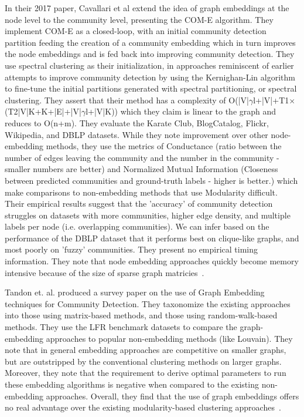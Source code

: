 \par{In their 2017 paper, Cavallari et al extend the idea of graph embeddings at the node level to the community level, presenting the COM-E algorithm. 
They implement COM-E as a closed-loop, with an initial community detection partition feeding the creation of a community embedding which in turn improves the node embeddings and is fed back into improving community detection. 
They use spectral clustering as their initialization, in approaches reminiscent of earlier attempts to improve community detection by using the Kernighan-Lin algorithm to fine-tune the initial partitions generated with spectral partitioning, or spectral clustering. 
They assert that their method has a complexity of O(|V|$\gamma$l+|V|+T1$\times$(T2|V|K+K+|E|+|V|$\gamma$l+|V|K)) which they claim is linear to the graph and reduces to O(n+m). 
They evaluate the Karate Club, BlogCatalog, Flickr, Wikipedia, and DBLP datasets. While they note improvement over other node-embedding methods, they use the metrics of Conductance (ratio between the number of edges leaving the community and the number in the community - smaller numbers are better) and Normalized Mutual Information (Closeness between predicted communities and ground-truth labels - higher is better.) which make comparisons to non-embedding methods that use Modularity difficult. 
Their empirical results suggest that the 'accuracy' of community detection struggles on datasets with more communities, higher edge density, and multiple labels per node (i.e. overlapping communities). 
We can infer based on the performance of the DBLP dataset that it performs best on clique-like graphs, and most poorly on 'fuzzy' communities. 
They present no empirical timing information. 
They note that node embedding approaches quickly become memory intensive because of the size of sparse graph matricies~\cite{Cavallari2017}.}

\par{Tandon et. al. produced a survey paper on the use of Graph Embedding techniques for Community Detection. They taxonomize the existing approaches into those using matrix-based methods, and those using random-walk-based methods. They use the LFR benchmark datasets to compare the graph-embedding approaches to popular non-embedding methods (like Louvain). They note that in general embedding approaches are competitive on smaller graphs, but are outstripped by the conventional clustering methods on larger graphs. Moreover, they note that the requirement to derive optimal parameters to run these embedding algorithms is negative when compared to the existing non-embedding approaches. Overall, they find that the use of graph embeddings offers no real advantage over the existing modularity-based clustering approaches~\cite{Tandon2021}.}

